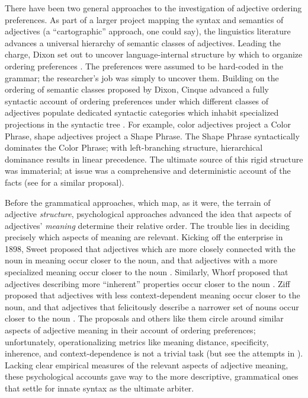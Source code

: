 \documentclass{pnastwo}
\begin{document}
\begin{article}
There have been two general approaches to the investigation of adjective ordering preferences. 
As part of a larger project mapping the syntax and semantics of adjectives (a ``cartographic'' approach, one could say), the linguistics literature advances a universal hierarchy of semantic classes of adjectives. Leading the charge, Dixon set out to uncover language-internal structure by which to organize ordering preferences \cite{dixon1982}. The preferences were assumed to be hard-coded in the grammar; the researcher's job was simply to uncover them. 
Building on the ordering of semantic classes proposed by Dixon, Cinque advanced a fully syntactic account of ordering preferences under which different classes of adjectives populate dedicated syntactic categories which inhabit specialized projections in the syntactic tree \cite{cinque1994}. For example, color adjectives project a Color Phrase, shape adjectives project a Shape Phrase. The Shape Phrase syntactically dominates the Color Phrase; with left-branching structure, hierarchical dominance results in linear precedence. The ultimate source of this rigid structure was immaterial; at issue was a comprehensive and deterministic account of the facts (see \cite{scott2002} for a similar proposal).

Before the grammatical approaches, which map, as it were, the terrain of adjective \emph{structure}, psychological approaches advanced the idea that aspects of adjectives' \emph{meaning} determine their relative order. The trouble lies in deciding precisely which aspects of meaning are relevant. 
Kicking off the enterprise in 1898, Sweet proposed that adjectives which are more closely connected with the noun in meaning occur closer to the noun, and that adjectives with a more specialized meaning occur closer to the noun \cite{sweet1898}. Similarly, Whorf proposed that adjectives describing more ``inherent'' properties occur closer to the noun \cite{whorf1945}. Ziff proposed that adjectives with less context-dependent meaning occur closer to the noun, and that adjectives that felicitously describe a narrower set of nouns occur closer to the noun \cite{ziff1960}. The proposals and others like them circle around similar aspects of adjective meaning in their account of ordering preferences; unfortunately, operationalizing metrics like meaning distance, specificity, inherence, and context-dependence is not a trivial task (but see the attempts in \cite{martin1969determinants,martin1970}). 
Lacking clear empirical measures of the relevant aspects of adjective meaning, these psychological accounts gave way to the more descriptive, grammatical ones that settle for innate syntax as the ultimate arbiter. 


\end{article}
\end{document}
